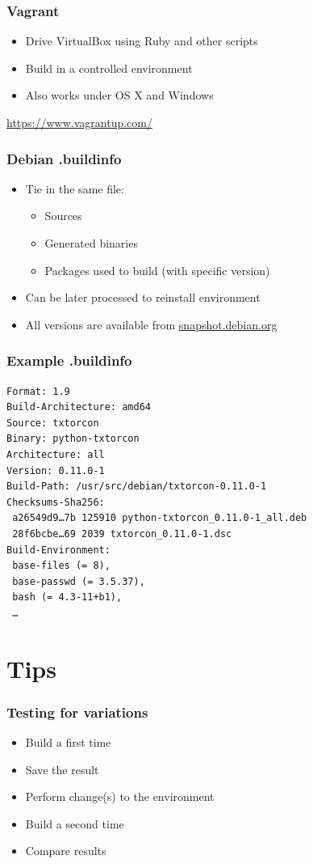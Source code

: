 \documentclass[14pt,aspectratio=169]{beamer}
\begin{document}
\begin{frame}
 \frametitle{Vagrant}

 \begin{itemize}
  \item Drive VirtualBox using Ruby and other scripts
  \item Build in a controlled environment
  \item Also works under OS X and Windows
 \end{itemize}

 \vfill
 {\footnotesize
 \url{https://www.vagrantup.com/}
 }
\end{frame}

\begin{frame}
 \frametitle{Debian .buildinfo}

 \begin{itemize}
  \item Tie in the same file:
   \begin{itemize}
    \item Sources
    \item Generated binaries
    \item Packages used to build (with specific version)
   \end{itemize}
  \item Can be later processed to reinstall environment
  \item All versions are available from \url{snapshot.debian.org}
 \end{itemize}
\end{frame}

\begin{frame}[fragile]
 \frametitle{Example .buildinfo}

{\small
\begin{verbatim}
Format: 1.9
Build-Architecture: amd64
Source: txtorcon
Binary: python-txtorcon
Architecture: all
Version: 0.11.0-1
Build-Path: /usr/src/debian/txtorcon-0.11.0-1
Checksums-Sha256:
 a26549d9…7b 125910 python-txtorcon_0.11.0-1_all.deb
 28f6bcbe…69 2039 txtorcon_0.11.0-1.dsc
Build-Environment:
 base-files (= 8),
 base-passwd (= 3.5.37),
 bash (= 4.3-11+b1),
 …
\end{verbatim}
}
\end{frame}

\section{Tips}

\begin{frame}
 \frametitle{Testing for variations}

 \begin{itemize}
  \item Build a first time
  \item Save the result
  \item Perform change(s) to the environment
  \item Build a second time
  \item Compare results
 \end{itemize}
\end{frame}
\end{document}
